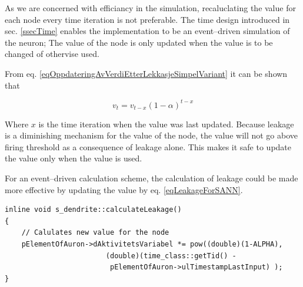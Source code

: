 	As we are concerned with efficiancy in the simulation, recaluclating the value for each node every time iteration is not preferable.
%
	The time design introduced in sec. \ref{ssecTime} enables the implementation to be an event--driven simulation of the neuron;
		The value of the node is only updated when the value is to be changed of othervise used.

	From eq. \eqref{eqOppdateringAvVerdiEtterLekkasjeSimpelVariant} it can be shown that 

	\begin{equation}
		v_t = v_{t-x} (1-\alpha)^{t-x}
		\label{eqLeakageForSANN}
	\end{equation}
	
	Where $x$ is the time iteration when the value was last updated.
	Because leakage is a diminishing mechanism for the value of the node, the value will not go above firing threshold as a consequence of leakage alone.
	This makes it safe to update the value only when the value is used.


	For an event--driven calculation scheme, the calculation of leakage could be made more effective by updating the value by eq. \eqref{eqLeakageForSANN}. %
%	


\begin{lstlisting}
inline void s_dendrite::calculateLeakage()
{ 
	// Calulates new value for the node
	pElementOfAuron->dAktivitetsVariabel *= pow((double)(1-ALPHA), 
						(double)(time_class::getTid() - 
						 pElementOfAuron->ulTimestampLastInput) );
}
\end{lstlisting}

